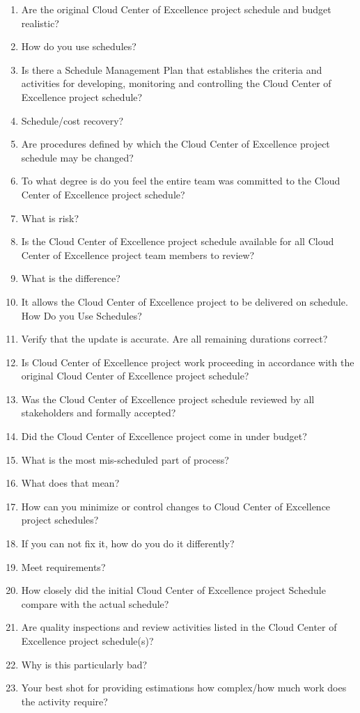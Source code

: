\documentclass[10pt,letterpaper]{article}
\begin{document}
\begingroup\small\begin{enumerate}[leftmargin=2.1em, itemsep=4pt]
\item[1.] Are the original Cloud Center of Excellence project schedule and budget realistic?
\item[2.] How do you use schedules?
\item[3.] Is there a Schedule Management Plan that establishes the criteria and activities for developing, monitoring and controlling the Cloud Center of Excellence project schedule?
\item[4.] Schedule/cost recovery?
\item[5.] Are procedures defined by which the Cloud Center of Excellence project schedule may be changed?
\item[6.] To what degree is do you feel the entire team was committed to the Cloud Center of Excellence project schedule?
\item[7.] What is risk?
\item[8.] Is the Cloud Center of Excellence project schedule available for all Cloud Center of Excellence project team members to review?
\item[9.] What is the difference?
\item[10.] It allows the Cloud Center of Excellence project to be delivered on schedule. How Do you Use Schedules?
\item[11.] Verify that the update is accurate. Are all remaining durations correct?
\item[12.] Is Cloud Center of Excellence project work proceeding in accordance with the original Cloud Center of Excellence project schedule?
\item[13.] Was the Cloud Center of Excellence project schedule reviewed by all stakeholders and formally accepted?
\item[14.] Did the Cloud Center of Excellence project come in under budget?
\item[15.] What is the most mis-scheduled part of process?
\item[16.] What does that mean?
\item[17.] How can you minimize or control changes to Cloud Center of Excellence project schedules?
\item[18.] If you can not fix it, how do you do it differently?
\item[19.] Meet requirements?
\item[20.] How closely did the initial Cloud Center of Excellence project Schedule compare with the actual schedule?
\item[21.] Are quality inspections and review activities listed in the Cloud Center of Excellence project schedule(s)?
\item[22.] Why is this particularly bad?
\item[23.] Your best shot for providing estimations how complex/how much work does the activity require?
\end{enumerate}\endgroup
\end{document}
